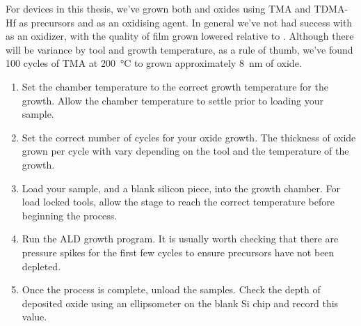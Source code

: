 For devices in this thesis, we've grown both  and  oxides using TMA and TDMA-Hf as precursors and
 as an oxidising agent. In general we've not had success with  as an oxidizer, with the quality of film
grown lowered relative to . Although there will be variance by tool and growth temperature, as a rule of thumb,
we've found 100 cycles of TMA at \SI{200}{\celsius} to grown approximately \SI{8}{\nano\meter} of oxide.


\begin{enumerate}
    \item Set the chamber temperature to the correct growth temperature for the growth. Allow the chamber temperature to settle prior to loading your sample.
    \item Set the correct number of cycles for your oxide growth. The thickness of oxide grown per cycle with vary depending on the tool and the temperature of the growth.
    \item Load your sample, and a blank silicon piece, into the growth chamber. For load locked tools, allow the stage to reach the correct temperature before beginning the process.
    \item Run the ALD growth program. It is usually worth checking that there are pressure spikes for the first few cycles to ensure precursors have not been depleted.
    \item Once the process is complete, unload the samples. Check the depth of deposited oxide using an ellipsometer on the blank Si chip and record this value.
\end{enumerate}
